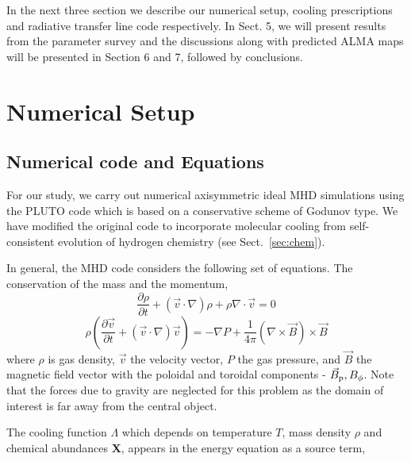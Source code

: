 \documentclass[useAMS,usenatbib,letters]{mn2e}
\begin{document}
In the next three section we describe our numerical setup, cooling
prescriptions and radiative transfer line code respectively. In
Sect. 5, we will present results from the parameter survey and the
discussions along with predicted ALMA maps will be presented in
Section 6 and 7, followed by conclusions.

\section{Numerical Setup}
\subsection{Numerical code and Equations}
For our study, we carry out numerical axisymmetric ideal MHD simulations using the PLUTO code \citep{Mignone:2007p644} which is based on a conservative scheme of Godunov type.
We have modified the original code to incorporate molecular cooling
from self-consistent evolution of hydrogen chemistry (see Sect.~\ref{sec:chem}).

  
In general, the MHD code considers the following set of equations.
The conservation of the mass and the momentum,
%
\begin{equation}\label{masscons}
\frac{\partial \rho}{\partial t} + (\vec{v} \cdot \nabla)\rho  +
\rho \nabla \cdot \vec{v} = 0
\end{equation}
%
\begin{equation}\label{momcons}
\rho(\frac{\partial \vec{v}}{\partial t} +
(\vec{v} \cdot \nabla) \vec{v}) =
- \nabla P + \frac{1}{4\pi} (\nabla \times \vec{B}) \times \vec{B}
\end{equation}
%
where $\rho$ is gas density, $\vec{v}$ the velocity vector, $P$ the gas pressure,
and $\vec{B}$ the magnetic field vector with the poloidal and toroidal
components - $\vec{B}_{\rm p}, {B}_{\phi}$. Note that the forces due
to gravity are neglected for this problem as the domain of interest is
far away from the central object.  
%

The cooling function $\Lambda$ which depends on temperature $T$, mass density $\rho$ and
chemical abundances {\bf{X}}, appears in the
energy equation as a source term,
\end{document}
